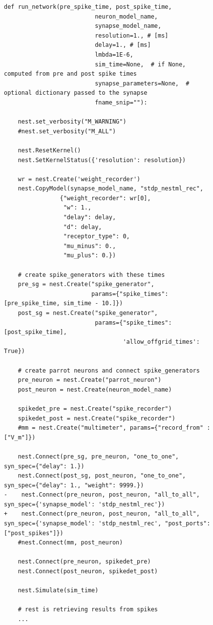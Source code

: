 \begin{figure}[ht!]
\centering

\begin{lstlisting}[language=Pydiff, label=lst:build_network_with_and_without_jit, caption={Creating the network with and without the JIT mechanism enabled. Color coding as in \autoref{lst:imports_with_and_without_jit}}]
def run_network(pre_spike_time, post_spike_time,
                          neuron_model_name,
                          synapse_model_name,
                          resolution=1., # [ms]
                          delay=1., # [ms]
                          lmbda=1E-6,
                          sim_time=None,  # if None, computed from pre and post spike times
                          synapse_parameters=None,  # optional dictionary passed to the synapse
                          fname_snip=""):

    nest.set_verbosity("M_WARNING")
    #nest.set_verbosity("M_ALL")

    nest.ResetKernel()
    nest.SetKernelStatus({'resolution': resolution})

    wr = nest.Create('weight_recorder')
    nest.CopyModel(synapse_model_name, "stdp_nestml_rec",
                {"weight_recorder": wr[0],
                 "w": 1.,
                 "delay": delay,
                 "d": delay,
                 "receptor_type": 0,
                 "mu_minus": 0.,
                 "mu_plus": 0.})

    # create spike_generators with these times
    pre_sg = nest.Create("spike_generator",
                         params={"spike_times": [pre_spike_time, sim_time - 10.]})
    post_sg = nest.Create("spike_generator",
                          params={"spike_times": [post_spike_time],
                                  'allow_offgrid_times': True})

    # create parrot neurons and connect spike_generators
    pre_neuron = nest.Create("parrot_neuron")
    post_neuron = nest.Create(neuron_model_name)

    spikedet_pre = nest.Create("spike_recorder")
    spikedet_post = nest.Create("spike_recorder")
    #mm = nest.Create("multimeter", params={"record_from" : ["V_m"]})

    nest.Connect(pre_sg, pre_neuron, "one_to_one", syn_spec={"delay": 1.})
    nest.Connect(post_sg, post_neuron, "one_to_one", syn_spec={"delay": 1., "weight": 9999.})
-    nest.Connect(pre_neuron, post_neuron, "all_to_all", syn_spec={'synapse_model': 'stdp_nestml_rec'})
+    nest.Connect(pre_neuron, post_neuron, "all_to_all", syn_spec={'synapse_model': 'stdp_nestml_rec', "post_ports": ["post_spikes"]})
    #nest.Connect(mm, post_neuron)

    nest.Connect(pre_neuron, spikedet_pre)
    nest.Connect(post_neuron, spikedet_post)

    nest.Simulate(sim_time)

    # rest is retrieving results from spikes
    ...

\end{lstlisting}
\end{figure}

